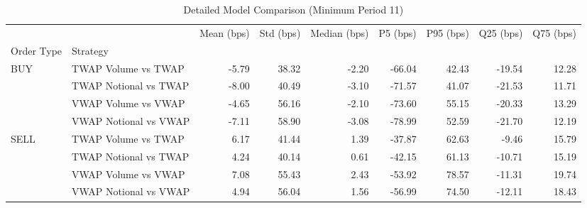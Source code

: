 \begin{table}
\caption{Detailed Model Comparison (Minimum Period 11)}
\label{tab:detailed_min_period_11}
\begin{tabular}{l|l|rrrrrrr}
\toprule
 &  & Mean (bps) & Std (bps) & Median (bps) & P5 (bps) & P95 (bps) & Q25 (bps) & Q75 (bps) \\
Order Type & Strategy &  &  &  &  &  &  &  \\
\midrule
\multirow[t]{4}{*}{BUY} & TWAP Volume vs TWAP & -5.79 & 38.32 & -2.20 & -66.04 & 42.43 & -19.54 & 12.28 \\
 & TWAP Notional vs TWAP & -8.00 & 40.49 & -3.10 & -71.57 & 41.07 & -21.53 & 11.71 \\
 & VWAP Volume vs VWAP & -4.65 & 56.16 & -2.10 & -73.60 & 55.15 & -20.33 & 13.29 \\
 & VWAP Notional vs VWAP & -7.11 & 58.90 & -3.08 & -78.99 & 52.59 & -21.70 & 12.19 \\
\cline{1-9}
\multirow[t]{4}{*}{SELL} & TWAP Volume vs TWAP & 6.17 & 41.44 & 1.39 & -37.87 & 62.63 & -9.46 & 15.79 \\
 & TWAP Notional vs TWAP & 4.24 & 40.14 & 0.61 & -42.15 & 61.13 & -10.71 & 15.19 \\
 & VWAP Volume vs VWAP & 7.08 & 55.43 & 2.43 & -53.92 & 78.57 & -11.31 & 19.74 \\
 & VWAP Notional vs VWAP & 4.94 & 56.04 & 1.56 & -56.99 & 74.50 & -12.11 & 18.43 \\
\cline{1-9}
\bottomrule
\end{tabular}
\end{table}
